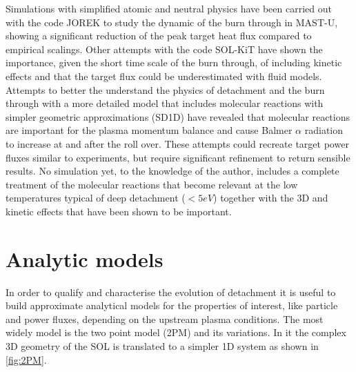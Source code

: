 Simulations with simplified atomic and neutral physics have been carried out with the code JOREK to study the dynamic of the burn through in MAST-U, showing a significant reduction of the peak target heat flux compared to empirical scalings.\cite{Smith2020,Smith2020a} Other attempts with the code SOL-KiT have shown the importance, given the short time scale of the burn through, of including kinetic effects and that the target flux could be underestimated with fluid models.\cite{Mijin2020}
Attempts to better the understand the physics of detachment and the burn through with a more detailed model that includes molecular reactions with simpler geometric approximations (SD1D) have revealed that molecular reactions are important for the plasma momentum balance and cause Balmer $\alpha$ radiation to increase at and after the roll over.\cite{Zhou2022} 
These attempts could recreate target power fluxes similar to experiments, but require significant refinement to return sensible results.\cite{Tskhakaya2009} No simulation yet, to the knowledge of the author, includes a complete treatment of the molecular reactions that become relevant at the low temperatures typical of deep detachment ($<5eV$) together with the 3D and kinetic effects that have been shown to be important.

\section{Analytic models}\label{Analytic models}

In order to qualify and characterise the evolution of detachment it is useful to build approximate analytical models for the properties of interest, like particle and power fluxes, depending on the upstream plasma conditions. The most widely model is the two point model (2PM) and its variations.\cite{HOBBS1966,Hobbs1967,Mahdavi1981,Keilhacker1982,Harbour1984,Lackner1984,Stangeby2001} In it the complex 3D geometry of the SOL is translated to a simpler 1D system as shown in \autoref{fig:2PM}.

